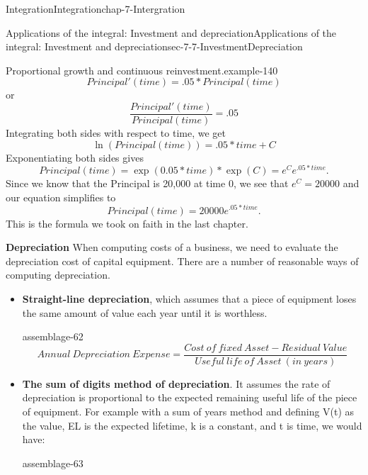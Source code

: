\documentclass[oneside,10pt,]{book}
\newcommand{\terminology}[1]{\textbf{#1}}
\numberwithin{equation}{section}
\begin{document}
\begin{chapterptx}{Integration}{}{Integration}{}{}{chap-7-Intergration}
\begin{sectionptx}{Applications of the integral: Investment and depreciation}{}{Applications of the integral: Investment and depreciation}{}{}{sec-7-7-InvestmentDepreciation}
\begin{example}{Proportional growth and continuous reinvestment.}{example-140}
%
\begin{equation*}
Principal' (time)=.05*Principal(time)
\end{equation*}
\hypertarget{p-3022}{}%
or%
%
\begin{equation*}
\frac{Principal' (time)}{Principal(time)}=.05
\end{equation*}
\hypertarget{p-3023}{}%
Integrating both sides with respect to time, we get%
%
\begin{equation*}
\ln (Principal(time))=.05*time+C
\end{equation*}
\hypertarget{p-3024}{}%
Exponentiating both sides gives%
%
\begin{equation*}
Principal(time)=\exp(0.05*time)*\exp(C)=e^C e^{.05*time}.
\end{equation*}
\hypertarget{p-3025}{}%
Since we know that the Principal is \textdollar{}20,000 at time 0, we see that \(e^C=20000\) and our equation simplifies to%
%
\begin{equation*}
Principal(time)=20000e^{.05*time}.
\end{equation*}
\hypertarget{p-3026}{}%
This is the formula we took on faith in the last chapter.%
\end{example}
\hypertarget{p-3027}{}%
\terminology{Depreciation} When computing costs of a business, we need to evaluate the depreciation cost of capital equipment.  There are a number of reasonable ways of computing depreciation.%
\leavevmode%
\begin{itemize}[label=\textbullet]
\item{}\hypertarget{p-3028}{}%
\terminology{Straight-line depreciation}, which assumes that a piece of equipment loses the same amount of value each year until it is worthless.%
\begin{assemblage}{}{assemblage-62}%
\hypertarget{p-3029}{}%
%
\begin{equation*}
Annual\ Depreciation\ Expense=  \frac{Cost\ of\ fixed\ Asset-Residual\ Value}{Useful\ life\ of\ Asset\ (in\ years)}
\end{equation*}
%
\end{assemblage}
\item{}\hypertarget{p-3030}{}%
\terminology{The sum of digits method of depreciation}.  It assumes the rate of depreciation is proportional to the expected remaining useful life of the piece of equipment. For example with a sum of years method and defining V(t) as the value, EL is the expected lifetime, k is a constant, and t is time, we would have:%
\begin{assemblage}{}{assemblage-63}%

\end{assemblage}
\end{itemize}
\end{sectionptx}
\end{chapterptx}
\end{document}
